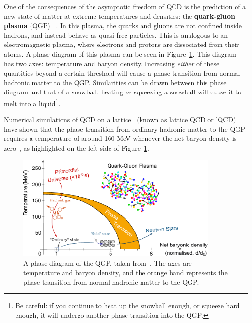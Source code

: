 One of the consequences of the asymptotic freedom of QCD is the prediction of a new state of matter at extreme temperatures and densities: the \textbf{quark-gluon plasma} (QGP) ~\cite{QGP1, QGP2}. In this plasma, the quarks and gluons are not confined inside hadrons, and instead behave as quasi-free particles. This is analogous to an electromagnetic plasma, where electrons and protons are dissociated from their atoms. A phase diagram of this plasma can be seen in Figure~\ref{fig:qgp_phase_diagram}. This diagram has two axes: temperature and baryon density. Increasing \textit{either} of these quantities beyond a certain threshold will cause a phase transition from normal hadronic matter to the QGP. Similarities can be drawn between this phase diagram and that of a snowball: heating \textit{{or}} squeezing a snowball will cause it to melt into a liquid\footnote{Be careful: if you continue to heat up the snowball enough, or squeeze hard enough, it will undergo another phase transition into the QGP.}.  


Numerical simulations of QCD on a lattice~\cite{LatticeQCD} (known as lattice QCD or lQCD) have shown that the phase transition from ordinary hadronic matter to the QGP requires a temperature of around 160 MeV whenever the net baryon density is zero~\cite{LatticeQCD_CriticalTemp}, as highlighted on the left side of Figure~\ref{fig:qgp_phase_diagram}. 

















\begin{figure}
    \centering
    \includegraphics[width=0.9\textwidth]{figures/introduction/qgp_phase_diagram.png}
    \caption{A phase diagram of the QGP, taken from~\cite{QGPPhaseDiagram}. The axes are temperature and baryon density, and the orange band represents the phase transition from normal hadronic matter to the QGP.}
    \label{fig:qgp_phase_diagram}
\end{figure}

